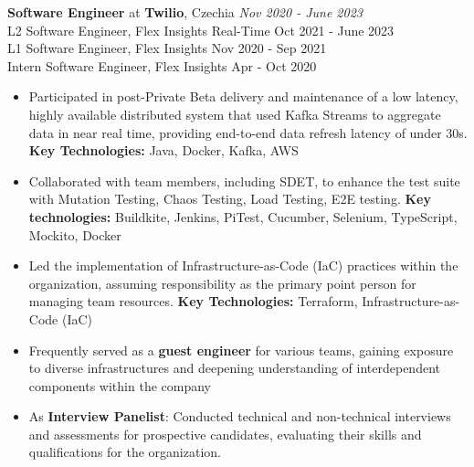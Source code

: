 {\textbf{Software Engineer} at \textbf{Twilio}, Czechia} 
    \hfill {\em Nov 2020 - June 2023}\\
    {L2 Software Engineer, Flex Insights Real-Time} \hfill  {Oct 2021 - June 2023}\\
    {L1 Software Engineer, Flex Insights} \hfill            {Nov 2020 - Sep 2021}\\
    {Intern Software Engineer, Flex Insights} \hfill        {Apr - Oct 2020}
    \begin{itemize}
        \item Participated in post-Private Beta delivery and maintenance of a low latency, highly available distributed system that used Kafka Streams to aggregate data in near real time, providing end-to-end data refresh latency of under 30s. \textbf{Key Technologies:} Java, Docker, Kafka, AWS
        \item Collaborated with team members, including SDET, to enhance the test suite with Mutation Testing, Chaos Testing, Load Testing, E2E testing. \textbf{Key technologies:} Buildkite, Jenkins, PiTest, Cucumber, Selenium, TypeScript, Mockito, Docker
        \item Led the implementation of Infrastructure-as-Code (IaC) practices within the organization, assuming responsibility as the primary point person for managing team resources. \textbf{Key Technologies:} Terraform, Infrastructure-as-Code (IaC)
        \item Frequently served as a \textbf{guest engineer} for various teams, gaining exposure to diverse infrastructures and deepening understanding of interdependent components within the company
        \item As \textbf{Interview Panelist}: Conducted technical and non-technical interviews and assessments for prospective candidates, evaluating their skills and qualifications for the organization.
    \end{itemize}